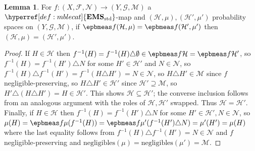 \documentclass[
  sigconf,
  screen, ]{acmart}
\theoremstyle{definition}
\newtheorem{lemma}[theorem]{Lemma}
\newcommand\calF{\mathcal F}
\newcommand\calG{\mathcal G}
\newcommand\calH{\mathcal H}
\newcommand\calM{\mathcal M}
\newcommand\calN{\mathcal N}
\newcommand\nref[2]{\hyperref[#1]{#2}} \newcommand\checkhigh{{\huge{\color{red}\textbf{TODO: check}}}}
\newcommand\negligibles{\mathrm{negligibles}}
\newcommand\texStdMble{\mathbf{EMS}_{\rm std}}
\newcommand\StdMble{{\nref{def:mblecat}{\texStdMble}}}
\begin{document}
\begin{lemma} \label{app:lem:epbmeas-inj}
  For $f:(X,\calF,\calN)\to(Y,\calG,\calM)$ a $\StdMble$-map
  and $(\calH,\mu),(\calH',\mu')$ probability spaces on $(Y,\calG,\calM)$,
  if $\epbmeas f (\calH,\mu)= \epbmeas f({\calH'},{\mu'})$
then $(\calH,\mu) = (\calH',\mu')$.
\end{lemma}
\begin{proof}
  If $H\in\calH$ then
  $f^{-1}(H) = f^{-1}(H)\triangle\emptyset\in\epbmeas f \calH = \epbmeas f{\calH'}$,
  so $f^{-1}(H) = f^{-1}(H')\triangle N$ for some $H'\in\calH'$
  and $N\in\calN$, so $f^{-1}(H)\triangle f^{-1}(H') = f^{-1}(H\triangle H') = N\in\calN$,
  so $H\triangle H'\in\calM$ since $f$ negligible-preserving,
  so $H\triangle H'\in\calH'$ since $\calH'\supseteq\calM$,
  so $H'\triangle (H\triangle H') = H\in\calH'$.
  This shows $\calH\subseteq\calH'$;
  the converse inclusion follows from an analogous argument
  with the roles of $\calH,\calH'$ swapped.
  Thus $\calH = \calH'$.
  Finally, if $H\in\calH$
  then $f^{-1}(H) = f^{-1}(H')\triangle N$ for some $H'\in\calH',N\in\calN$,
  so $\mu(H) = \epbmeas f\mu(f^{-1}(H))
  =\epbmeas f\mu'(f^{-1}(H')\triangle N)
  = \mu'(H') = \mu(H)$
  where the last equality follows from $f^{-1}(H)\triangle f^{-1}(H') = N\in\calN$
  and $f$ negligible-preserving and $\negligibles(\mu) = \negligibles(\mu') = \calM$.
\end{proof}
\end{document}
